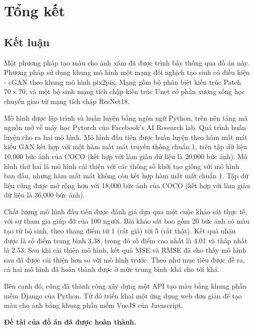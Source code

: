 \documentclass[a4paper, 12pt]{report}
\begin{document}
\chapter{Tổng kết}

\section{Kết luận}

Một phương pháp tạo màu cho ảnh xám đã được trình bày thông qua đồ án này.
Phương pháp sử dụng khung mô hình một mạng đối nghịch tạo sinh có điều kiện - cGAN theo khung mô hình pix2pix.
Mạng gồm bộ phân biệt kiến trúc Patch $70 \times 70$, và một bộ sinh mạng tích chập kiến trúc Unet có phần xương sống học chuyển giao từ mạng tích chập ResNet18.\vspace{5pt}

Mô hình được lập trình và huấn luyện bằng ngôn ngữ Python, trên nên tảng mã nguồn mở về máy học Pytorch của Facebook's AI Research lab.
Quá trình huấn luyện cho ra hai mô hình.
Mô hình đầu tiên được huấn luyện theo hàm mất mát kiểu GAN kết hợp với một hàm mất mát truyền thống chuẩn 1, trên tập dữ liệu 10,000 bức ảnh của COCO (kết hợp với làm giàu dữ liệu là 20,000 bức ảnh).
Mô hình thứ hai là mô hình cải thiện với các thông số khởi tạo giống với mô hình ban đầu, nhưng hàm mất mát không còn kết hợp hàm mất mát chuẩn 1.
Tập dữ liệu cũng được mở rộng hơn với 18,000 bức ảnh của COCO (kết hợp với làm giàu dữ liệu là 36,000 bức ảnh).\vspace{5pt}

Chất lượng mô hình đầu tiên được đánh giá dựa qua một cuộc khảo sát thực tế, với sự tham gia giúp đỡ của 100 người.
Bài khảo sát bao gồm 20 bức ảnh có màu tạo từ bộ sinh, theo thang điểm từ 1 (rất giả) tới 5 (rất thật).
Kết quả nhận được là số điểm trung bình 3.38, trong đó số điểm cao nhất là 4.01 và thấp nhất là 2.53.
Sau khi cải thiện mô hình, kết quả MSE và RMSE đã cho thấy mô hình sau đã được cải thiện hơn so với mô hình trước.
Theo như mục tiêu được đề ra, cả hai mô hình đã hoàn thành được ở mức trung bình--khá cho tới khá.\vspace{5pt}

Bên cạnh đó, cũng đã thành công xây dựng một API tạo màu bằng khung phần mềm Django của Python.
Từ đó triển khai một ứng dụng web đơn giản để tạo màu cho ảnh bằng khung phần mềm VueJS của Javascript.\vspace{5pt}

\textbf{Đề tài của đồ án đã được hoàn thành.}
\end{document}
